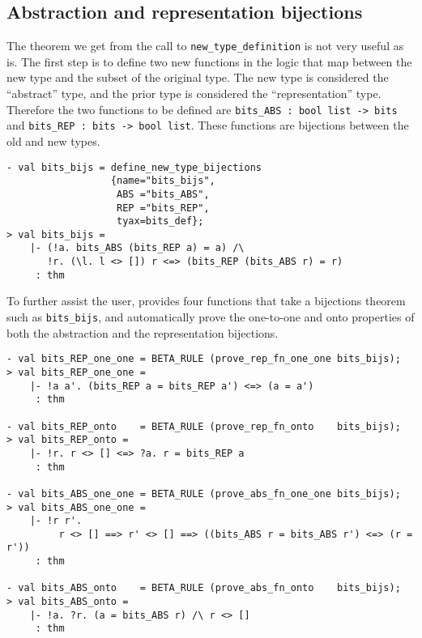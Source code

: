 \subsection{Abstraction and representation bijections}

The theorem we get from the call to \texttt{new\_type\_definition} is not very
useful as is. The first step is to define two new functions in the logic that
map between the new type and the subset of the original type. The new type is
considered the ``abstract'' type, and the prior type is considered the
``representation'' type. Therefore the two functions to be defined are
\texttt{bits\_ABS {:} bool list -> bits} and
\texttt{bits\_REP {:} bits -> bool list}. These functions are bijections between
the old and new types.
%
\begin{session}
\begin{verbatim}
- val bits_bijs = define_new_type_bijections
                  {name="bits_bijs",
                   ABS ="bits_ABS",
                   REP ="bits_REP",
                   tyax=bits_def};
> val bits_bijs =
    |- (!a. bits_ABS (bits_REP a) = a) /\
       !r. (\l. l <> []) r <=> (bits_REP (bits_ABS r) = r)
     : thm
\end{verbatim}
\end{session}

To further assist the user, \HOL{} provides four \ML{} functions that take a bijections
theorem such as \texttt{bits\_bijs}, and automatically prove the one-to-one and onto properties
of both the abstraction and the representation bijections.
%
\begin{session}
\begin{verbatim}
- val bits_REP_one_one = BETA_RULE (prove_rep_fn_one_one bits_bijs);
> val bits_REP_one_one =
    |- !a a'. (bits_REP a = bits_REP a') <=> (a = a')
     : thm

- val bits_REP_onto    = BETA_RULE (prove_rep_fn_onto    bits_bijs);
> val bits_REP_onto =
    |- !r. r <> [] <=> ?a. r = bits_REP a
     : thm

- val bits_ABS_one_one = BETA_RULE (prove_abs_fn_one_one bits_bijs);
> val bits_ABS_one_one =
    |- !r r'.
         r <> [] ==> r' <> [] ==> ((bits_ABS r = bits_ABS r') <=> (r = r'))
     : thm

- val bits_ABS_onto    = BETA_RULE (prove_abs_fn_onto    bits_bijs);
> val bits_ABS_onto =
    |- !a. ?r. (a = bits_ABS r) /\ r <> []
     : thm
\end{verbatim}
\end{session}

